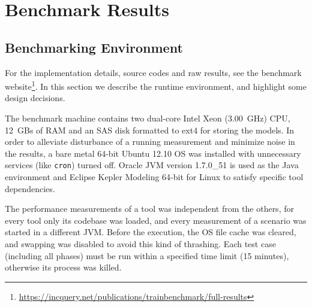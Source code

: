\chapter{Benchmark Results}
\label{cha:benchmarkresults}

\section{Benchmarking Environment}
\label{sec:environment}

For the implementation details, source codes and raw results, see the benchmark website\footnote{\url{https://incquery.net/publications/trainbenchmark/full-results}}. In this section we describe the runtime environment, and highlight some design decisions.

The benchmark machine contains two dual-core Intel Xeon (3.00~GHz) CPU, 12~GBs of RAM and an SAS disk formatted to ext4 for storing the models. In order to alleviate disturbance of a running measurement and minimize noise in the results, a bare metal 64-bit Ubuntu 12.10 OS was installed with unnecessary services (like \texttt{cron}) turned off. Oracle JVM version 1.7.0\_51 is used as the Java environment and Eclipse Kepler Modeling 64-bit for Linux to satisfy specific tool dependencies.

The performance measurements of a tool was independent from the others, \ie for every tool only its codebase was loaded, and every measurement of a scenario was started in a different JVM. Before the execution, the OS file cache was cleared, and swapping was disabled to avoid this kind of thrashing. Each test case (including all phases) must be run within a specified time limit (15 minutes), otherwise its process was killed.


